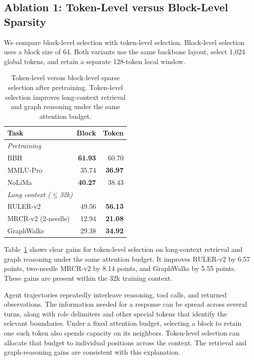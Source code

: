 \subsection{Ablation 1: Token-Level versus Block-Level Sparsity}
\label{sec:token-block-ablation}

We compare block-level selection with token-level selection.
Block-level selection uses a block size of 64.
Both variants use the same backbone layout, select 1,024 global tokens, and retain a separate 128-token local window.

\begin{table}[H]
    \centering
    \small
    \setlength{\tabcolsep}{10pt}
    \begin{tabular}{lrr}
        \toprule
        \textbf{Task} & \textbf{Block} & \textbf{Token} \\
        \midrule
        \multicolumn{3}{l}{\textit{Pretraining}} \\
        BBH & \textbf{61.93} & 60.70 \\
        MMLU-Pro & 35.74 & \textbf{36.97} \\
        NoLiMa & \textbf{40.27} & 38.43 \\
        \midrule
        \multicolumn{3}{l}{\textit{Long context ($\leq$32k)}} \\
        RULER-v2 & 49.56 & \textbf{56.13} \\
        MRCR-v2 (2-needle) & 12.94 & \textbf{21.08} \\
        GraphWalks & 29.38 & \textbf{34.92} \\
        \bottomrule
    \end{tabular}
    \caption{Token-level versus block-level sparse selection after pretraining. Token-level selection improves long-context retrieval and graph reasoning under the same attention budget.}
    \label{tab:token-block-ablation}
\end{table}

Table~\ref{tab:token-block-ablation} shows clear gains for token-level selection on long-context retrieval and graph reasoning under the same attention budget.
It improves RULER-v2 by 6.57 points, two-needle MRCR-v2 by 8.14 points, and GraphWalks by 5.55 points.
These gains are present within the 32k training context.

Agent trajectories repeatedly interleave reasoning, tool calls, and returned observations.
The information needed for a response can be spread across several turns, along with role delimiters and other special tokens that identify the relevant boundaries.
Under a fixed attention budget, selecting a block to retain one such token also spends capacity on its neighbors.
Token-level selection can allocate that budget to individual positions across the context.
The retrieval and graph-reasoning gains are consistent with this explanation.

